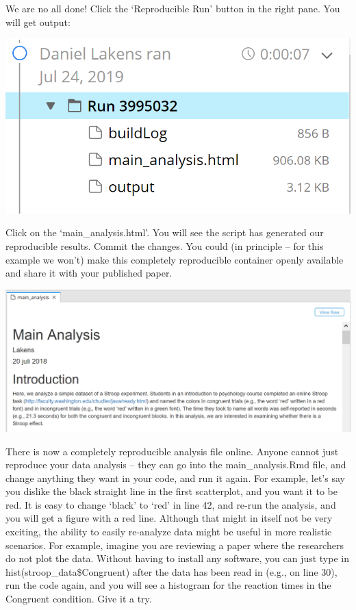 \documentclass[
  oneside]{krantz}
\begin{document}
We are no all done! Click the `Reproducible Run' button in the right pane. You
will get output:

\begin{center}\includegraphics[width=1\linewidth]{images/6c4278d56ff2d9101052c74a61783b43} \end{center}

Click on the `main\_analysis.html'. You will see the script has generated our
reproducible results. Commit the changes. You could (in principle -- for this
example we won't) make this completely reproducible container openly
available and share it with your published paper.

\begin{center}\includegraphics[width=1\linewidth]{images/f8904ae8e964bd88b2c21078ea9e81f9} \end{center}

There is now a completely reproducible analysis file online. Anyone cannot just
reproduce your data analysis -- they can go into the main\_analysis.Rmd file, and
change anything they want in your code, and run it again. For example, let's say
you dislike the black straight line in the first scatterplot, and you want it to
be red. It is easy to change `black' to `red' in line 42, and re-run the
analysis, and you will get a figure with a red line. Although that might in
itself not be very exciting, the ability to easily re-analyze data might be
useful in more realistic scenarios. For example, imagine you are reviewing a
paper where the researchers do not plot the data. Without having to install any
software, you can just type in hist(stroop\_data\$Congruent) after the data has
been read in (e.g., on line 30), run the code again, and you will see a
histogram for the reaction times in the Congruent condition. Give it a try.
\end{document}
